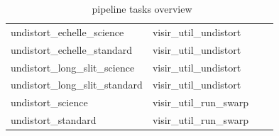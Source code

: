 \begin{table}[htbp]
\begin{tabular}{|l|l|c|c|}
undistort\_echelle\_science & visir\_util\_undistort & & \\
undistort\_echelle\_standard & visir\_util\_undistort & & \\
undistort\_long\_slit\_science & visir\_util\_undistort & & \\
undistort\_long\_slit\_standard & visir\_util\_undistort & & \\
undistort\_science & visir\_util\_run\_swarp & & \\
undistort\_standard & visir\_util\_run\_swarp & & \\
\hline
\end{tabular}
\caption{\instname\ pipeline tasks overview}
\end{table}
